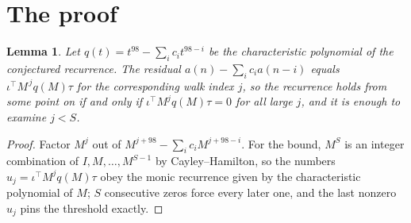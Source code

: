 \documentclass[11pt,a4paper]{article}
\theoremstyle{plain}
\newtheorem{lemma}[theorem]{Lemma}
\theoremstyle{definition}
\begin{document}
\section{The proof}

\begin{lemma}\label{lem:crit}
Let $q(t)=t^{98}-\sum_i c_it^{98-i}$ be the characteristic polynomial of the
conjectured recurrence. The residual $a(n)-\sum_ic_ia(n-i)$ equals
$\iota^{\!\top}M^{\,j}q(M)\tau$ for the corresponding walk index $j$, so the recurrence
holds from some point on if and only if $\iota^{\!\top}M^{j}q(M)\tau=0$ for all large $j$,
and it is enough to examine $j<S$.
\end{lemma}

\begin{proof}
Factor $M^{j}$ out of $M^{j+98}-\sum_ic_iM^{j+98-i}$. For the bound, $M^{S}$
is an integer combination of $I,M,\dots,M^{S-1}$ by Cayley--Hamilton, so the numbers
$u_j=\iota^{\!\top}M^{j}q(M)\tau$ obey the monic recurrence given by the characteristic
polynomial of $M$; $S$ consecutive zeros force every later one, and the last nonzero $u_j$
pins the threshold exactly.
\end{proof}
\end{document}
